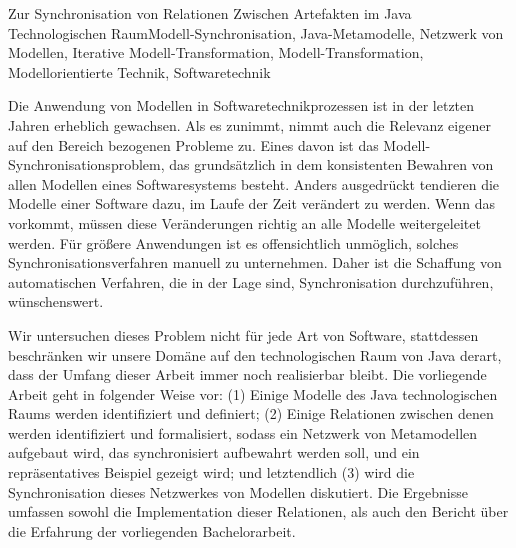 \documentclass[tuberlin,cic,tc,english,noabntcite, oneside]{iiufrgs}
\begin{document}
\begin{englishabstract}{Zur Synchronisation von Relationen Zwischen Artefakten im Java Technologischen Raum}{Modell-Synchronisation, Java-Metamodelle, Netzwerk von Modellen, Iterative Modell-Transformation, Modell-Transformation, Modellorientierte Technik, Softwaretechnik}

Die Anwendung von Modellen in Softwaretechnikprozessen ist in der letzten Jahren erheblich gewachsen. Als es zunimmt, nimmt auch die Relevanz eigener auf den Bereich bezogenen Probleme zu. Eines davon ist das Modell-Synchronisationsproblem, das grundsätzlich in dem konsistenten Bewahren von allen Modellen eines Softwaresystems besteht. Anders ausgedrückt tendieren die Modelle einer Software dazu, im Laufe der Zeit verändert zu werden. Wenn das vorkommt, müssen diese Veränderungen richtig an alle Modelle weitergeleitet werden. Für größere Anwendungen ist es offensichtlich unmöglich, solches Synchronisationsverfahren manuell zu unternehmen. Daher ist die Schaffung von automatischen Verfahren, die in der Lage sind, Synchronisation durchzuführen, wünschenswert.

Wir untersuchen dieses Problem nicht für jede Art von Software, stattdessen beschränken wir unsere Domäne auf den technologischen Raum von Java derart, dass der Umfang dieser Arbeit immer noch realisierbar bleibt. Die vorliegende Arbeit geht in folgender Weise vor: (1) Einige Modelle des Java technologischen Raums werden identifiziert und definiert; (2) Einige Relationen zwischen denen werden identifiziert und formalisiert, sodass ein Netzwerk von Metamodellen aufgebaut wird, das synchronisiert aufbewahrt werden soll, und ein repräsentatives Beispiel gezeigt wird; und letztendlich (3) wird die Synchronisation dieses Netzwerkes von Modellen diskutiert. Die Ergebnisse umfassen sowohl die Implementation dieser Relationen, als auch den Bericht über die Erfahrung der vorliegenden Bachelorarbeit.

\end{englishabstract}

\listoffigures

\end{document}

